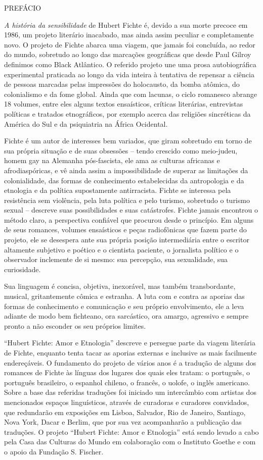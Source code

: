 PREFÁCIO

\emph{A história da sensibilidade} de Hubert Fichte é, devido a sua
morte precoce em 1986, um projeto literário inacabado, mas ainda assim
peculiar e completamente novo. O projeto de Fichte abarca uma viagem,
que jamais foi concluída, ao redor do mundo, sobretudo ao longo das
marcações geográficas que desde Paul Gilroy definimos como Black
Atlântico. O referido projeto une uma prosa autobiográfica experimental
praticada ao longo da vida inteira à tentativa de repensar a ciência de
pessoas marcadas pelas impressões do holocausto, da bomba atômica, do
colonialismo e da fome global. Ainda que com lacunas, o ciclo romanesco
abrange 18 volumes, entre eles alguns textos ensaísticos, críticas
literárias, entrevistas políticas e tratados etnográficos, por exemplo
acerca das religiões sincréticas da América do Sul e da psiquiatria na
África Ocidental.

Fichte é um autor de interesses bem variados, que giram sobretudo em
torno de sua própria situação e de suas obsessões -- tendo crescido como
meio-judeu, homem gay na Alemanha pós-fascista, ele ama as culturas
africanas e afrodiaspóricas, e vê ainda assim a impossibilidade de
superar as limitações da colonialidade, das formas de conhecimento
estabelecidas da antropologia e da etnologia e da política supostamente
antirracista. Fichte se interessa pela resistência sem violência, pela
luta política e pelo turismo, sobretudo o turismo sexual -- descreve
suas possibilidades e suas catástrofes. Fichte jamais encontrou o método
claro, a perspectiva confiável que procurou desde o princípio. Em alguns
de seus romances, volumes ensaísticos e peças radiofônicas que fazem
parte do projeto, ele se desespera ante sua própria posição
intermediária entre o escritor altamente subjetivo e poético e o
cientista paciente, o jornalista político e o observador inclemente de
si mesmo: sua percepção, sua sexualidade, sua curiosidade.

Sua linguagem é concisa, objetiva, inexorável, mas também transbordante,
musical, gritantemente cômica e estranha. A luta com e contra as aporias
das formas de conhecimento e comunicação e seu próprio envolvimento, ele
a leva adiante de modo bem fichteano, ora sarcástico, ora amargo,
agressivo e sempre pronto a não esconder os seu próprios limites.

``Hubert Fichte: Amor e Etnologia'' descreve e persegue parte da viagem
literária de Fichte, enquanto tenta tacar as aporias externas e
inclusive as mais facilmente endereçáveis. O fundamento do projeto de
vários anos é a tradução de alguns dos romances de Fichte às línguas dos
lugares dos quais eles tratam: o português, o português brasileiro, o
espanhol chileno, o francês, o uolofe, o inglês americano. Sobre a base
das referidas traduções foi iniciado um intercâmbio com artistas dos
mencionados espaços linguísticos, através de curadoras e curadores
convidados, que redundarão em exposições em Lisboa, Salvador, Rio de
Janeiro, Santiago, Nova York, Dacar e Berlim, que por sua vez
acompanharão a publicação das traduções. O projeto ``Hubert Fichte: Amor
e Etnologia'' está sendo levado a cabo pela Casa das Culturas do Mundo
em colaboração com o Instituto Goethe e com o apoio da Fundação S.
Fischer.

